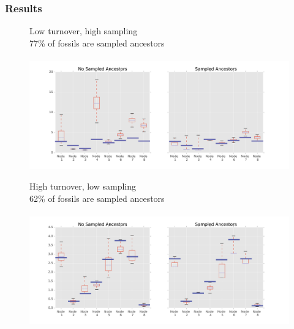 \documentclass[]{beamer}
\begin{document}
\begin{frame}
\frametitle{Results}
\begin{center}
\begin{figure}
Low turnover, high sampling  \\
77\% of fossils are sampled ancestors \\
\boldsymbol{\mu} \lambda  \psi   \rho \\
\includegraphics[scale=0.4]{images/LowTurnHighSampnodes.png}
\end{figure}
\end{center}
\end{frame}


\begin{frame}
\begin{center}
\begin{figure}
High turnover, low sampling  \\
62\% of fossils are sampled ancestors \\
\mathlarger{\mathlarger{\mu}} \lambda   \psi   \rho \\
\includegraphics[scale=0.4]{images/HighTurnLowSampnodes.png}
\end{figure}
\end{center}
\end{frame}
\end{document}
